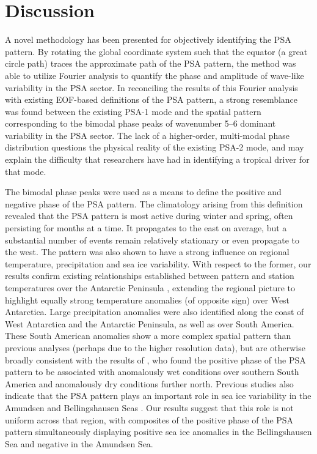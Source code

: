 \section{Discussion}

A novel methodology has been presented for objectively identifying the PSA pattern. By rotating the global coordinate system such that the equator (a great circle path) traces the approximate path of the PSA pattern, the method was able to utilize Fourier analysis to quantify the phase and amplitude of wave-like variability in the PSA sector. In reconciling the results of this Fourier analysis with existing EOF-based definitions of the PSA pattern, a strong resemblance was found between the existing PSA-1 mode and the spatial pattern corresponding to the bimodal phase peaks of wavenumber 5--6 dominant variability in the PSA sector. The lack of a higher-order, multi-modal phase distribution questions the physical reality of the existing PSA-2 mode, and may explain the difficulty that researchers have had in identifying a tropical driver for that mode.     

The bimodal phase peaks were used as a means to define the positive and negative phase of the PSA pattern. The climatology arising from this definition revealed that the PSA pattern is most active during winter and spring, often persisting for months at a time. It propagates to the east on average, but a substantial number of events remain relatively stationary or even propagate to the west. The pattern was also shown to have a strong influence on regional temperature, precipitation and sea ice variability. With respect to the former, our results confirm existing relationships established between pattern and station temperatures over the Antarctic Peninsula \citep[e.g.][]{Schneider2012,Yu2012}, extending the regional picture to highlight equally strong temperature anomalies (of opposite sign) over West Antarctica. Large precipitation anomalies were also identified along the coast of West Antarctica and the Antarctic Peninsula, as well as over South America. These South American anomalies show a more complex spatial pattern than previous analyses (perhaps due to the higher resolution data), but are otherwise broadly consistent with the results of \citet{Mo2001}, who found the positive phase of the PSA pattern to be associated with anomalously wet conditions over southern South America and anomalously dry conditions further north. Previous studies also indicate that the PSA pattern plays an important role in sea ice variability in the Amundsen and Bellingshausen Seas \citep{Raphael2014}. Our results suggest that this role is not uniform across that region, with composites of the positive phase of the PSA pattern simultaneously displaying positive sea ice anomalies in the Bellingshausen Sea and negative in the Amundsen Sea.  

